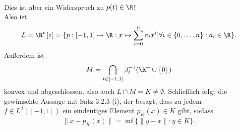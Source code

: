 \begin{solution}
\begin{align*}
\end{align*}
Dies ist aber ein Widerspruch zu $p(t) \in \R$! \\
Also ist
\begin{align*}
L = \R^n[z] = \{p: [-1,1] \to \R: x \mapsto \sum_{i = 0}^n a_ix^i |
\forall i \in \{0,\dots,n\}: a_i \in \R\}.
\end{align*}
Außerdem ist
\begin{align*}
  M = \bigcap_{t \in [-1,1]}\beta_t^{-1}(\R^+\cup \{0\})
\end{align*}
konvex und abgeschlossen, also auch $L \cap M = K \neq \emptyset$.
Schließlich folgt die gewünschte Aussage mit Satz 3.2.3 (i), der besagt,
dass zu jedem $f \in L^2([-1,1])$ ein eindeutiges Element $p_K(x) \in K$ gibt,
sodass
\begin{align*}
  \|x - p_K(x)\| = \inf\{\|y-x\|: y \in K\}.
\end{align*}
\end{solution}
